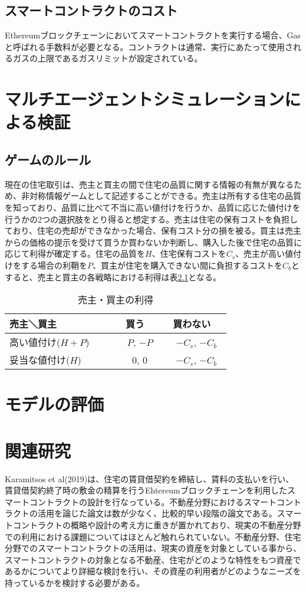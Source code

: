 \documentclass[a4paper,fontsize=11pt,report,notitlepage,line_length=38zw,number_of_lines=40]{jlreq}
\begin{document}
\section{スマートコントラクトのコスト}
Ethereumブロックチェーンにおいてスマートコントラクトを実行する場合、Gasと呼ばれる手数料が必要となる。コントラクトは通常、実行にあたって使用されるガスの上限であるガスリミットが設定されている。

\chapter{マルチエージェントシミュレーションによる検証}
\section{ゲームのルール}
現在の住宅取引は、売主と買主の間で住宅の品質に関する情報の有無が異なるため、非対称情報ゲームとして記述することができる。売主は所有する住宅の品質を知っており、品質に比べて不当に高い値付けを行うか、品質に応じた値付けを行うかの2つの選択肢をとり得ると想定する。売主は住宅の保有コストを負担しており、住宅の売却ができなかった場合、保有コスト分の損を被る。買主は売主からの価格の提示を受けて買うか買わないか判断し、購入した後で住宅の品質に応じて利得が確定する。住宅の品質を$H$、住宅保有コストを$C_s$、売主が高い値付けをする場合の利鞘を$P$、買主が住宅を購入できない間に負担するコストを$C_b$とすると、売主と買主の各戦略における利得は表\ref{ritoku}となる。

\begin{table}
\begin{center}
\caption{売主・買主の利得}
\label{ritoku}
\begin{tabular}{l|cc}
売主＼買主 & 買う & 買わない \\ \hline
高い値付け($H+P$)　　 & 　$P$,  $-P$ & 　$-C_s$,  $-C_b$　 \\
妥当な値付け($H$)　　 & 　0, 0 & 　$-C_s$,  $-C_b$　
\end{tabular}
\end{center}
\end{table}%



\chapter{モデルの評価}

\chapter{関連研究}
Karamitsos et al(2019)\cite{karamitsos2019}は、住宅の賃貸借契約を締結し、賃料の支払いを行い、賃貸借契約終了時の敷金の精算を行うEhtereumブロックチェーンを利用したスマートコントラクトの設計を行なっている。不動産分野におけるスマートコントラクトの活用を論じた論文は数が少なく、比較的早い段階の論文である。スマートコントラクトの概略や設計の考え方に重きが置かれており、現実の不動産分野での利用における課題についてはほとんど触れられていない。不動産分野、住宅分野でのスマートコントラクトの活用は、現実の資産を対象としている事から、スマートコントラクトの対象となる不動産、住宅がどのような特性をもつ資産であるかについてより詳細な検討を行い、その資産の利用者がどのようなニーズを持っているかを検討する必要がある。
\end{document}
